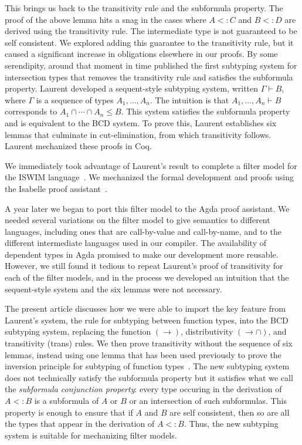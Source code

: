 \documentclass{article}
\begin{document}
This brings us back to the transitivity rule and the subformula
property. The proof of the above lemma hits a snag in the cases where
$A <: C$ and $B <: D$ are derived using the transitivity rule. The
intermediate type is not guaranteed to be self consistent. We explored
adding this guarantee to the transitivity rule, but it caused a
significant increase in obligations elsewhere in our proofs. By some
serendipity, around that moment in time \citet{Laurent:2018aa}
published the first subtyping system for intersection types that
removes the transitivity rule and satisfies the subformula property.
Laurent developed a sequent-style subtyping system, written $\Gamma
\vdash B$, where $\Gamma$ is a sequence of types $A_1,\ldots,A_n$. The
intuition is that $A_1,\ldots,A_n \vdash B$ corresponds to $A_1 \cap
\cdots \cap A_n \leq B$. This system satisfies the subformula property
and is equivalent to the BCD system. To prove this, Laurent
establishes six lemmas that culminate in cut-elimination, from which
transitivity follows. Laurent mechanized these proofs in Coq.

We immediately took advantage of Laurent's result to complete a filter
model for the ISWIM
language~\citep{Landin:1966la,G.-D.-Plotkin:1975on,Felleisen:2009aa}.
We mechanized the formal development and proofs using the Isabelle
proof assistant~\citep{Siek:2018aa}.

A year later we began to port this filter model to the Agda proof
assistant. We needed several variations on the filter model to give
semantics to different languages, including ones that are
call-by-value and call-by-name, and to the different intermediate
languages used in our compiler.  The availability of dependent types
in Agda promised to make our development more reusable.  However, we
still found it tedious to repeat Laurent's proof of transitivity for
each of the filter models, and in the process we developed an
intuition that the sequent-style system and the six lemmas were not
necessary.

The present article discusses how we were able to import the key
feature from Laurent's system, the rule for subtyping between function
types, into the BCD subtyping system, replacing the function $(\to)$,
distributivity $({\to}{\cap})$, and transitivity (trans) rules.  We
then prove transitivity without the sequence of six lemmas, instead
using one lemma that has been used previously to prove the inversion
principle for subtyping of function
types~\citep{Barendregt:2013aa}. The new subtyping system does not
technically satisfy the subformula property but it satisfies what we
call the \emph{subformula conjunction property}: every type occuring
in the derivation of $A <: B$ is a subformula of $A$ or $B$ or an
intersection of such subformulas.  This property is enough to ensure
that if $A$ and $B$ are self consistent, then so are all the types
that appear in the derivation of $A <: B$.  Thus, the new subtyping
system is suitable for mechanizing filter models.
\end{document}
